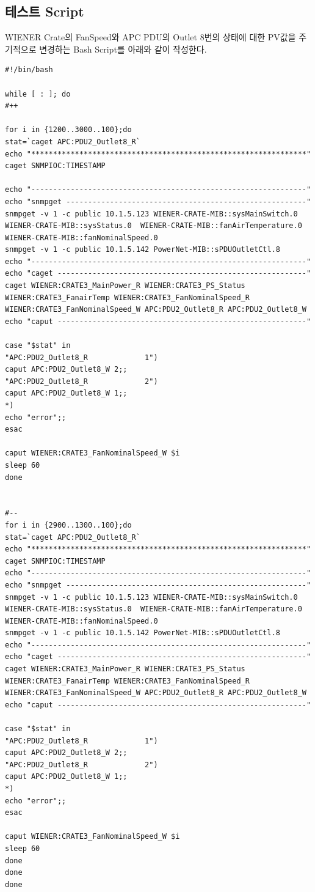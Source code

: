 \documentclass[11pt
  , a4paper
  , article
  , oneside
]{memoir}
\begin{document}
\subsection{테스트 Script}
WIENER Crate의 FanSpeed와 APC PDU의 Outlet 8번의 상태에 대한 PV값을 주기적으로 변경하는 Bash Script를 아래와 같이 작성한다. 

\begin{lstlisting}[style=termstyle]
#!/bin/bash

while [ : ]; do  
#++

for i in {1200..3000..100};do
stat=`caget APC:PDU2_Outlet8_R`
echo "***************************************************************"
caget SNMPIOC:TIMESTAMP

echo "---------------------------------------------------------------"
echo "snmpget -------------------------------------------------------"
snmpget -v 1 -c public 10.1.5.123 WIENER-CRATE-MIB::sysMainSwitch.0  WIENER-CRATE-MIB::sysStatus.0  WIENER-CRATE-MIB::fanAirTemperature.0 WIENER-CRATE-MIB::fanNominalSpeed.0
snmpget -v 1 -c public 10.1.5.142 PowerNet-MIB::sPDUOutletCtl.8
echo "---------------------------------------------------------------"
echo "caget ---------------------------------------------------------"
caget WIENER:CRATE3_MainPower_R WIENER:CRATE3_PS_Status WIENER:CRATE3_FanairTemp WIENER:CRATE3_FanNominalSpeed_R WIENER:CRATE3_FanNominalSpeed_W APC:PDU2_Outlet8_R APC:PDU2_Outlet8_W 
echo "caput ---------------------------------------------------------"

case "$stat" in
"APC:PDU2_Outlet8_R             1")
caput APC:PDU2_Outlet8_W 2;;
"APC:PDU2_Outlet8_R             2")
caput APC:PDU2_Outlet8_W 1;;
*)
echo "error";;
esac

caput WIENER:CRATE3_FanNominalSpeed_W $i
sleep 60
done


#--
for i in {2900..1300..100};do
stat=`caget APC:PDU2_Outlet8_R`
echo "***************************************************************"
caget SNMPIOC:TIMESTAMP
echo "---------------------------------------------------------------"
echo "snmpget -------------------------------------------------------"
snmpget -v 1 -c public 10.1.5.123 WIENER-CRATE-MIB::sysMainSwitch.0  WIENER-CRATE-MIB::sysStatus.0  WIENER-CRATE-MIB::fanAirTemperature.0 WIENER-CRATE-MIB::fanNominalSpeed.0
snmpget -v 1 -c public 10.1.5.142 PowerNet-MIB::sPDUOutletCtl.8
echo "---------------------------------------------------------------"
echo "caget ---------------------------------------------------------"
caget WIENER:CRATE3_MainPower_R WIENER:CRATE3_PS_Status WIENER:CRATE3_FanairTemp WIENER:CRATE3_FanNominalSpeed_R WIENER:CRATE3_FanNominalSpeed_W APC:PDU2_Outlet8_R APC:PDU2_Outlet8_W 
echo "caput ---------------------------------------------------------"

case "$stat" in
"APC:PDU2_Outlet8_R             1")
caput APC:PDU2_Outlet8_W 2;;
"APC:PDU2_Outlet8_R             2")
caput APC:PDU2_Outlet8_W 1;;
*)
echo "error";;
esac

caput WIENER:CRATE3_FanNominalSpeed_W $i
sleep 60
done
done
done
\end{lstlisting}
\end{document}
